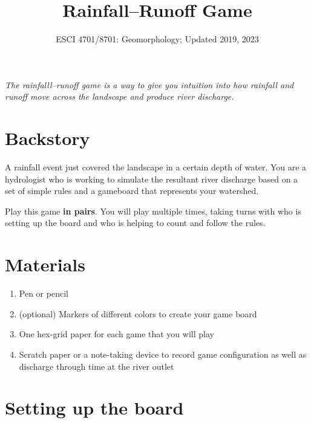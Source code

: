 \documentclass[letterpaper,10pt]{amsart}
\title{Rainfall--Runoff Game}
\author{ESCI 4701/8701: Geomorphology; Updated 2019, 2023}
\begin{document}

{\let\newpage\relax\maketitle}

\textit{The rainfalll--runoff game is a way to give you intuition into how rainfall and runoff move across the landscape and produce river discharge.}

\section{Backstory}

A rainfall event just covered the landscape in a certain depth of water. You are a hydrologist who is working to simulate the resultant river discharge based on a set of simple rules and a gameboard that represents your watershed.

Play this game \textbf{in pairs}. You will play multiple times, taking turns with who is setting up the board and who is helping to count and follow the rules.

\section{Materials}

\begin{enumerate}
 \item Pen or pencil
 \item (optional) Markers of different colors to create your game board
 \item One hex-grid paper for each game that you will play
 \item Scratch paper or a note-taking device to record game configuration as well as discharge through time at the river outlet
\end{enumerate}

\section{Setting up the board}
\end{document}
